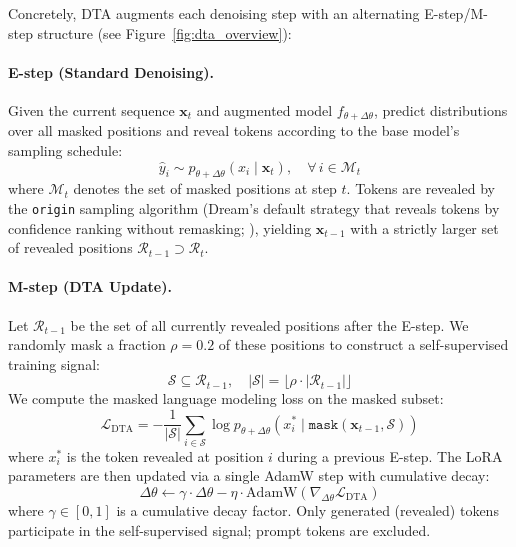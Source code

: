 \documentclass{article}
\begin{document}
Concretely, DTA augments each denoising step with an alternating E-step/M-step structure (see Figure~\ref{fig:dta_overview}):

\paragraph{E-step (Standard Denoising).} Given the current sequence $\mathbf{x}_t$ and augmented model $f_{\theta + \Delta\theta}$, predict distributions over all masked positions and reveal tokens according to the base model's sampling schedule:
\begin{equation}
\hat{y}_i \sim p_{\theta + \Delta\theta}(x_i \mid \mathbf{x}_t), \quad \forall\, i \in \mathcal{M}_t
\end{equation}
where $\mathcal{M}_t$ denotes the set of masked positions at step $t$. Tokens are revealed by the \texttt{origin} sampling algorithm (Dream's default strategy that reveals tokens by confidence ranking without remasking; \citealp{dream2025}), yielding $\mathbf{x}_{t-1}$ with a strictly larger set of revealed positions $\mathcal{R}_{t-1} \supset \mathcal{R}_t$.

\paragraph{M-step (DTA Update).} Let $\mathcal{R}_{t-1}$ be the set of all currently revealed positions after the E-step. We randomly mask a fraction $\rho = 0.2$ of these positions to construct a self-supervised training signal:
\begin{equation}
\mathcal{S} \subseteq \mathcal{R}_{t-1}, \quad |\mathcal{S}| = \lfloor \rho \cdot |\mathcal{R}_{t-1}| \rfloor
\end{equation}
We compute the masked language modeling loss on the masked subset:
\begin{equation}
\mathcal{L}_{\text{DTA}} = -\frac{1}{|\mathcal{S}|} \sum_{i \in \mathcal{S}} \log p_{\theta + \Delta\theta}\!\left(x_i^{*} \mid \texttt{mask}(\mathbf{x}_{t-1}, \mathcal{S})\right)
\end{equation}
where $x_i^{*}$ is the token revealed at position $i$ during a previous E-step. The LoRA parameters are then updated via a single AdamW step with cumulative decay:
\begin{equation}
\Delta\theta \leftarrow \gamma \cdot \Delta\theta - \eta \cdot \text{AdamW}(\nabla_{\Delta\theta} \mathcal{L}_{\text{DTA}})
\label{eq:mstep}
\end{equation}
where $\gamma \in [0, 1]$ is a cumulative decay factor. Only generated (revealed) tokens participate in the self-supervised signal; prompt tokens are excluded.
\end{document}

